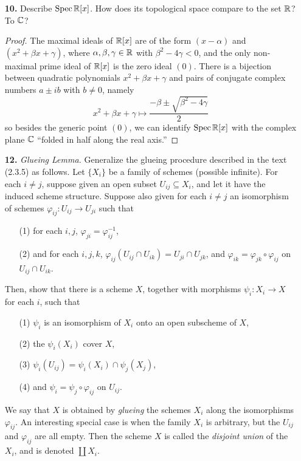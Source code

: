 \documentclass{article}
\begin{document}
\begin{enumerate} [label=\textbf{\arabic*.}, leftmargin=0em]
\item[\textbf{10.}] Describe $\operatorname{Spec}{\mathbb{R}[x]}$. How does its topological space compare to the set $\mathbb{R}$? To $\mathbb{C}$?

\begin{proof}
    The maximal ideals of $\mathbb{R}[x]$ are of the form $(x - \alpha)$ and $(x^2 + \beta x + \gamma)$, where $\alpha, \beta, \gamma \in \mathbb{R}$ with $\beta^2 - 4 \gamma < 0$, and the only non-maximal prime ideal of $\mathbb{R}[x]$ is the zero ideal $(0)$. There is a bijection between quadratic polynomials $x^2 + \beta x + \gamma$ and pairs of conjugate complex numbers $a \pm i b$ with $b \neq 0$, namely
    \begin{equation*}
        x^2 + \beta x + \gamma \mapsto \frac{-\beta \pm \sqrt{\beta^2 -4\gamma}}{2} 
    \end{equation*}
    so besides the generic point $(0)$, we can identify $\operatorname{Spec}{\mathbb{R}[x]}$ with the complex plane $\mathbb{C}$ ``folded in half along the real axis.''
\end{proof}

\item[\textbf{12.}] \textit{Glueing Lemma.} Generalize the glueing procedure described in the text (2.3.5) as follows. Let $\{X_i\}$ be a family of schemes (possible infinite). For each $i \neq j$, suppose given an open subset $U_{ij} \subseteq X_i$, and let it have the induced scheme structure. Suppose also given for each $i \neq j$ an isomorphism of schemes $\varphi_{ij} : U_{ij} \to U_{ji}$ such that
\begin{itemize}
    \item[(1)] for each $i, j$, $\varphi_{ji} = \varphi_{ij}^{-1}$,
    \item[(2)] and for each $i, j, k$, $\varphi_{ij}(U_{ij} \cap U_{ik}) = U_{ji} \cap U_{jk}$, and $\varphi_{ik} = \varphi_{jk} \circ \varphi_{ij}$ on $U_{ij} \cap U_{ik}$.
\end{itemize}
Then, show that there is a scheme $X$, together with morphisms $\psi_i : X_i \to X$ for each $i$, such that
\begin{itemize}
    \item[(1)] $\psi_i$ is an isomorphism of $X_i$ onto an open subscheme of $X$,
    \item[(2)] the $\psi_i(X_i)$ cover $X$,
    \item[(3)] $\psi_i(U_{ij}) = \psi_i(X_i) \cap \psi_j(X_j)$,
    \item[(4)] and $\psi_i = \psi_j \circ \varphi_{ij}$ on $U_{ij}$.
\end{itemize}
We say that $X$ is obtained by \textit{glueing} the schemes $X_i$ along the isomorphisms $\varphi_{ij}$. An interesting special case is when the family $X_i$ is arbitrary, but the $U_{ij}$ and $\varphi_{ij}$ are all empty. Then the scheme $X$ is called the \textit{disjoint union} of the $X_i$, and is denoted $\coprod X_i$.


\end{enumerate}
\end{document}

